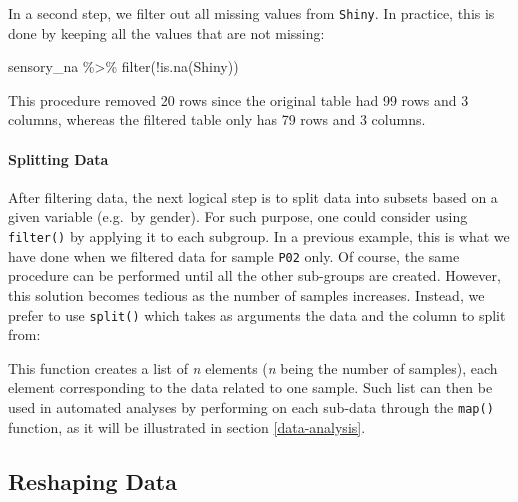 \documentclass[
]{krantz}
\makeatletter
\newenvironment{Shaded}{\begin{snugshade}}{\end{snugshade}}
\newcommand{\FunctionTok}[1]{\textcolor[rgb]{0,0,0}{#1}}
\newcommand{\NormalTok}[1]{#1}
\newcommand{\SpecialCharTok}[1]{\textcolor[rgb]{0,0,0}{#1}}
\newenvironment{kframe}{%
\medskip{}
\setlength{\fboxsep}{.8em}
 \def\at@end@of@kframe{}%
 \ifinner\ifhmode%
  \def\at@end@of@kframe{\end{minipage}}%
  \begin{minipage}{\columnwidth}%
 \fi\fi%
 \def\FrameCommand##1{\hskip\@totalleftmargin \hskip-\fboxsep
 \colorbox{shadecolor}{##1}\hskip-\fboxsep
     \hskip-\linewidth \hskip-\@totalleftmargin \hskip\columnwidth}%
 \MakeFramed {\advance\hsize-\width
   \@totalleftmargin\z@ \linewidth\hsize
   \@setminipage}}%
 {\par\unskip\endMakeFramed%
 \at@end@of@kframe}
\renewenvironment{Shaded}{\begin{kframe}}{\end{kframe}}
\makeatother
\begin{document}
In a second step, we filter out all missing values from \texttt{Shiny}. In practice, this is done by keeping all the values that are not missing:

\begin{Shaded}
\begin{Highlighting}[]
\NormalTok{sensory\_na }\SpecialCharTok{\%\textgreater{}\%}
  \FunctionTok{filter}\NormalTok{(}\SpecialCharTok{!}\FunctionTok{is.na}\NormalTok{(Shiny))}
\end{Highlighting}
\end{Shaded}

This procedure removed 20 rows since the original table had 99 rows and 3 columns, whereas the filtered table only has 79 rows and 3 columns.

\hypertarget{splitting-data}{%
\paragraph*{Splitting Data}\label{splitting-data}}

After filtering data, the next logical step is to split data into subsets based on a given variable (e.g.~by gender). For such purpose, one could consider using \texttt{filter()} by applying it to each subgroup. In a previous example, this is what we have done when we filtered data for sample \texttt{P02} only. Of course, the same procedure can be performed until all the other sub-groups are created. However, this solution becomes tedious as the number of samples increases. Instead, we prefer to use \texttt{split()} which takes as arguments the data and the column to split from:

\begin{Shaded}
\end{Shaded}

This function creates a list of \emph{n} elements (\emph{n} being the number of samples), each element corresponding to the data related to one sample. Such list can then be used in automated analyses by performing on each sub-data through the \texttt{map()} function, as it will be illustrated in section \ref{data-analysis}.

\hypertarget{pivots}{%
\subsection{Reshaping Data}\label{pivots}}
\end{document}
